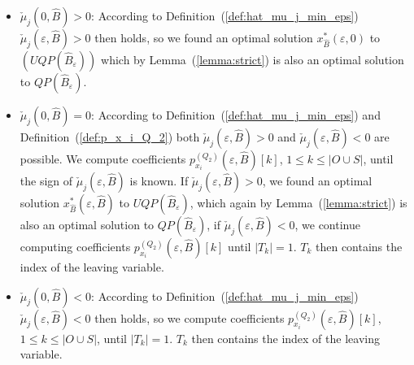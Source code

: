 \documentclass[a4paper]{article}
\newcommand{\px}[3]{\ensuremath{p_{x_{#1}}^{(#2)}(\varepsilon, #3)}}
\begin{document}
\begin{itemize}
\item $\check{\mu}_{j}(0, \hat{B}) > 0$:
According to Definition~(\ref{def:hat_mu_j_min_eps})
$\check{\mu}_{j}(\varepsilon, \hat{B}) > 0$ then holds, so we found an optimal
solution $x_{\hat{B}}^{*}(\varepsilon, 0)$ to $(UQP(\hat{B}_{\varepsilon}))$
which by Lemma~(\ref{lemma:strict}) is also an optimal solution to
$QP(\hat{B}_{\varepsilon})$.

\item $\check{\mu}_{j}(0, \hat{B}) = 0$:
According to Definition~(\ref{def:hat_mu_j_min_eps}) and
Definition~(\ref{def:p_x_i_Q_2}) both
$\check{\mu}_{j}(\varepsilon, \hat{B}) > 0$ and
$\check{\mu}_{j}(\varepsilon, \hat{B}) < 0$ are possible.
We compute coefficients $\px{i}{Q_{2}}{\hat{B}}[k]$,
$1 \leq k \leq \left|O \cup S\right|$, until the sign of
$\check{\mu}_{j}(\varepsilon, \hat{B})$ is known. 
If $\check{\mu}_{j}(\varepsilon, \hat{B}) > 0$, we found an optimal solution
$x_{\hat{B}}^{*}(\varepsilon, \hat{B})$ to $UQP(\hat{B}_{\varepsilon})$,
which again by Lemma~(\ref{lemma:strict}) is also an optimal solution to
$QP(\hat{B}_{\varepsilon})$,
if $\check{\mu}_{j}(\varepsilon, \hat{B}) < 0$, we continue computing
coefficients $\px{i}{Q_{2}}{\hat{B}}[k]$ until
$\left|T_{k}\right|=1$. $T_{k}$ then contains the index of the leaving
variable.

\item $\check{\mu}_{j}(0, \hat{B}) < 0$:
According to Definition~(\ref{def:hat_mu_j_min_eps})
$\check{\mu}_{j}(\varepsilon, \hat{B}) < 0$ then holds, so we compute
coefficients $\px{i}{Q_{2}}{\hat{B}}[k]$,
$1 \leq k \leq \left|O \cup S\right|$, until $\left|T_{k}\right|=1$.
$T_{k}$ then contains the index of the leaving
variable.
\end{itemize}
\end{document}
